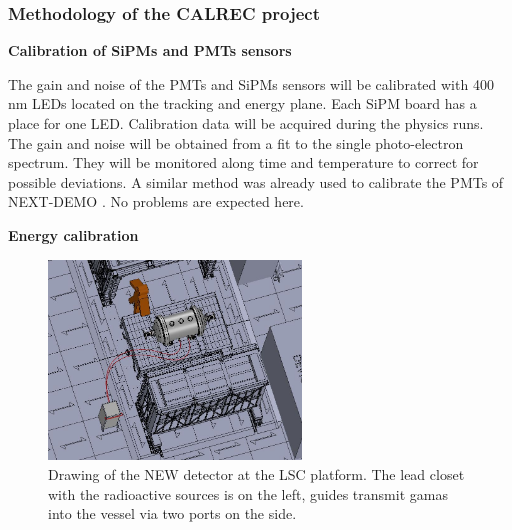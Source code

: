 
\subsubsection*{Methodology of the CALREC project}

%

{\bf Calibration of SiPMs and PMTs sensors}

The gain and noise of the PMTs and SiPMs sensors will be calibrated with 400 nm LEDs located on the tracking and energy plane. Each SiPM board has a place for one LED.
Calibration data will be acquired during the physics runs.
The gain and noise will be obtained from a fit to the single photo-electron spectrum.
They will be monitored along time and temperature to correct for possible deviations. 
A similar method was already used to calibrate the PMTs of NEXT-DEMO \cite{NEXT-DEMO}. No problems are expected here.

{\bf Energy calibration}

\begin{figure}
\begin{center}
\includegraphics[width=0.6\textwidth]{img/CALIB_LSC_sources.jpg}
\caption{\small Drawing of the NEW detector at the LSC platform. The lead closet with the radioactive sources is on the left,  guides transmit gamas into the vessel via two ports on the side.}
\label{fig:CALREC_LSC_sources}
\end{center}
\end{figure}


